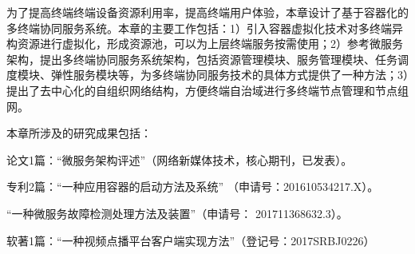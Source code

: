 为了提高终端终端设备资源利用率，提高终端用户体验，本章设计了基于容器化的多终端协同服务系统。本章的主要工作包括：1）引入容器虚拟化技术对多终端异构资源进行虚拟化，形成资源池，可以为上层终端服务按需使用；2）参考微服务架构，提出多终端协同服务系统架构，包括资源管理模块、服务管理模块、任务调度模块、弹性服务模块等，为多终端协同服务技术的具体方式提供了一种方法；3）提出了去中心化的自组织网络结构，方便终端自治域进行多终端节点管理和节点组网。

本章所涉及的研究成果包括：

论文1篇：“微服务架构评述”（网络新媒体技术，核心期刊，已发表）。

专利2篇：“一种应用容器的启动方法及系统” （申请号：201610534217.X）。

“一种微服务故障检测处理方法及装置”（申请号： 201711368632.3）。

软著1篇：“一种视频点播平台客户端实现方法”（登记号：2017SRBJ0226）